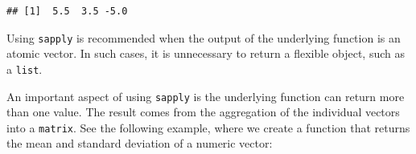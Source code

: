\documentclass[11pt,]{book}
\newenvironment{Shaded}{\begin{snugshade}}{\end{snugshade}}
\newcommand{\KeywordTok}[1]{\textcolor[rgb]{0.27,0.27,0.27}{\textbf{#1}}}
\newcommand{\DecValTok}[1]{\textcolor[rgb]{0.06,0.06,0.06}{#1}}
\newcommand{\StringTok}[1]{\textcolor[rgb]{0.5,0.5,0.5}{#1}}
\newcommand{\CommentTok}[1]{\textcolor[rgb]{0.56,0.35,0.01}{\textit{#1}}}
\newcommand{\ControlFlowTok}[1]{\textcolor[rgb]{0.13,0.29,0.53}{\textbf{#1}}}
\newcommand{\OperatorTok}[1]{\textcolor[rgb]{0.81,0.36,0.00}{\textbf{#1}}}
\newcommand{\NormalTok}[1]{#1}
\begin{document}
\begin{verbatim}
## [1]  5.5  3.5 -5.0
\end{verbatim}

Using \texttt{sapply} is recommended when the output of the underlying
function is an atomic vector. In such cases, it is unnecessary to return
a flexible object, such as a \texttt{list}.

An important aspect of using \texttt{sapply} is the underlying function
can return more than one value. The result comes from the aggregation of
the individual vectors into a \texttt{matrix}. See the following
example, where we create a function that returns the mean and standard
deviation of a numeric vector:

\begin{Shaded}
\end{Shaded}
\end{document}

